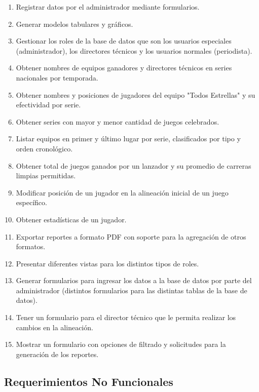 \documentclass{report}
\begin{document}
            \begin{enumerate}
                \item Registrar datos por el administrador mediante formularios.
                \item Generar modelos tabulares y gráficos.
                \item Gestionar los roles de la base de datos que son los usuarios especiales (administrador), los 
                directores técnicos y los usuarios normales (periodista).
                \item Obtener nombres de equipos ganadores y directores técnicos en series nacionales por temporada.
                \item Obtener nombres y posiciones de jugadores del equipo "Todos Estrellas" y su efectividad por 
                serie.
                \item Obtener series con mayor y menor cantidad de juegos celebrados.
                \item Listar equipos en primer y último lugar por serie, clasificados por tipo y orden cronológico.
                \item Obtener total de juegos ganados por un lanzador y su promedio de carreras limpias permitidas.
                \item Modificar posición de un jugador en la alineación inicial de un juego específico.
                \item Obtener estadísticas de un jugador.
                \item Exportar reportes a formato PDF con soporte para la agregación de otros formatos.
                \item Presentar diferentes vistas para los distintos tipos de roles.
                \item Generar formularios para ingresar los datos a la base de datos por parte del administrador 
                (distintos formularios para las distintas tablas de la base de datos).
                \item Tener un formulario para el director técnico que le permita realizar los cambios en  la 
                alineación.
                \item Mostrar un formulario con opciones de filtrado y solicitudes para la generación de los reportes.
            \end{enumerate}

        \vspace{1cm}

        \subsection*{Requerimientos No Funcionales}
\end{document}
